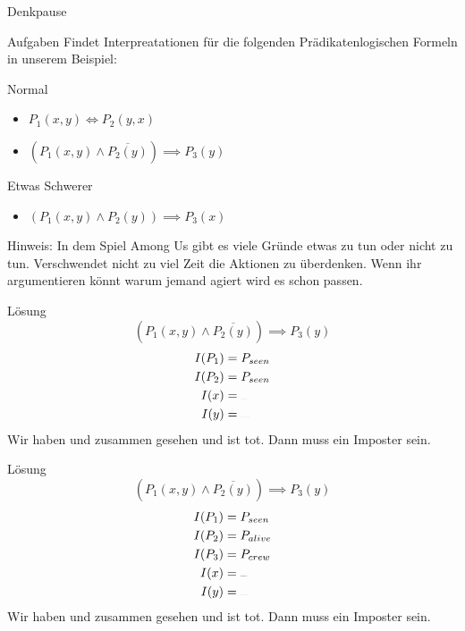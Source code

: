 {
\begin{frame}[fragile]{Denkpause}
    \footnotesize
        \begin{alertblock}{Aufgaben}
            Findet Interpreatationen für die folgenden Prädikatenlogischen Formeln in unserem Beispiel:
        \end{alertblock}
        \begin{block}{Normal}
            \begin{itemize}
                \item $P_1(x,y) \Leftrightarrow P_2(y,x)$
                \item $(P_1(x,y) \wedge \overline{P_2(y)}) \implies P_3(y)$
            \end{itemize}
        \end{block}
        \begin{block}{Etwas Schwerer}
            \begin{itemize}
                \item $(P_1(x,y) \wedge P_2(y)) \implies P_3(x)$
            \end{itemize}
        \end{block}
        \alert{Hinweis:} In dem Spiel Among Us gibt es viele Gründe etwas zu tun oder nicht zu tun.
        Verschwendet nicht zu viel Zeit die Aktionen zu überdenken. Wenn ihr argumentieren könnt warum jemand agiert wird es schon passen.
\end{frame}

\begin{frame}{Lösung}
    $$(P_1(x,y) \wedge \overline{P_2(y)}) \implies P_3(y)$$
        \begin{align*}
            I(P_1) &= P_{seen}\\
            I(P_2) &= P_{seen}\\
            I(x) &= \sus{blue}\\
            I(y) &= \sus{yellow}
        \end{align*}
        Wir haben  und  zusammen gesehen und  ist tot. Dann muss  ein Imposter sein.
\end{frame}

\begin{frame}{Lösung}
    $$(P_1(x,y) \wedge \overline{P_2(y)}) \implies P_3(y)$$
        \begin{align*}
            I(P_1) &= P_{seen}\\
            I(P_2) &= P_{alive}\\
            I(P_3) &= P_{crew}\\
            I(x) &= \sus{red}\\
            I(y) &= \sus{green}
        \end{align*}
        Wir haben  und  zusammen gesehen und  ist tot. Dann muss  ein Imposter sein.
\end{frame}

}
